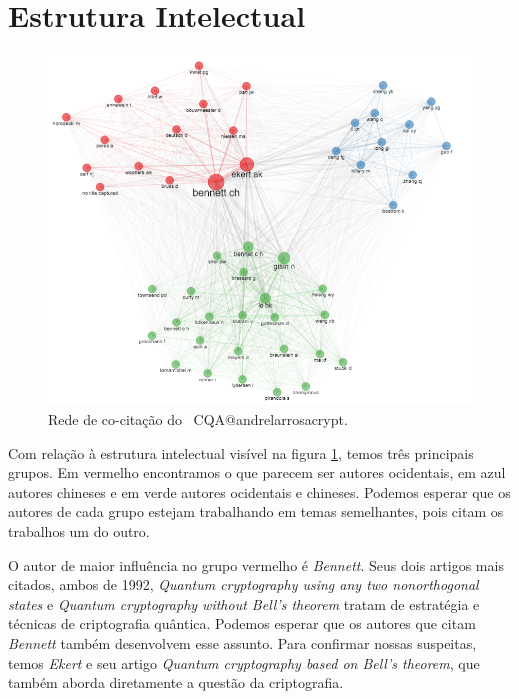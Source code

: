 \section{Estrutura Intelectual}

\begin{figure}
    \centering
    \includegraphics[angle=0,width=1\textwidth]{experiments/andrelarrosacrypt/AnaliseBibliometrica/CriptografiaQuantica/imagens/CQA@andrelarrosacrypt_CoCit.png}
    \caption{Rede de co-citação do \dataset\ CQA@andrelarrosacrypt.}
    \label{CQA@andrelarrosacrypt_CoCit}
\end{figure}

Com relação à estrutura intelectual visível na figura \ref{CQA@andrelarrosacrypt_CoCit}, temos três principais grupos. Em vermelho encontramos o que parecem ser autores ocidentais, em azul autores chineses e em verde autores ocidentais e chineses. Podemos esperar que os autores de cada grupo estejam trabalhando em temas semelhantes, pois citam os trabalhos um do outro.

O autor de maior influência no grupo vermelho é \textit{Bennett}. Seus dois artigos mais citados, ambos de 1992, \textit{Quantum cryptography using any two nonorthogonal states} e \textit{Quantum cryptography without Bell’s theorem} tratam de estratégia e técnicas de criptografia quântica. Podemos esperar que os autores que citam \textit{Bennett} também desenvolvem esse assunto. Para confirmar nossas suspeitas, temos \textit{Ekert} e seu artigo \textit{Quantum cryptography based on Bell’s theorem}, que também aborda diretamente a questão da criptografia.

